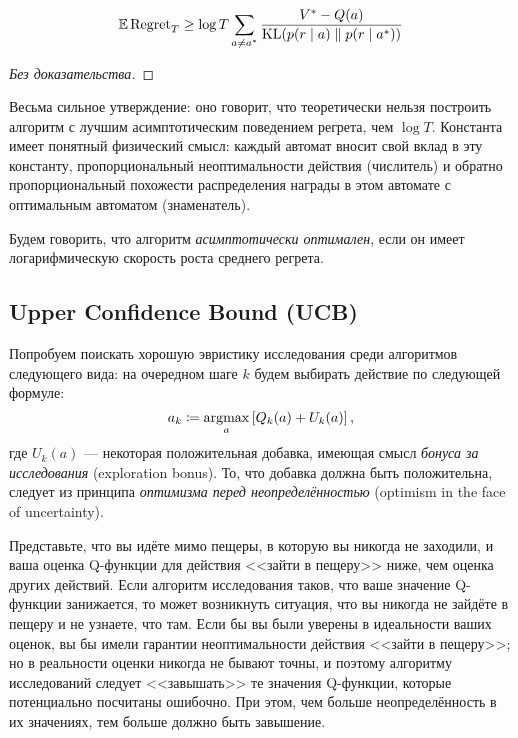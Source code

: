 \begin{theorem}
$$\mathbb{E} \operatorname{Regret}_T \ge \log T \sum_{a \ne a^*} \frac{V^* - Q(a)}{\operatorname{KL}(p(r \mid a) \parallel p(r \mid a^*))}$$
\begin{proof}[Без доказательства]
\end{proof}
\end{theorem}

Весьма сильное утверждение: оно говорит, что теоретически нельзя построить алгоритм с лучшим асимптотическим поведением регрета, чем $\log T$. Константа имеет понятный физический смысл: каждый автомат вносит свой вклад в эту константу, пропорциональный неоптимальности действия (числитель) и обратно пропорциональный похожести распределения награды в этом автомате с оптимальным автоматом (знаменатель). 

\begin{definition}
Будем говорить, что алгоритм \emph{асимптотически оптимален}, если он имеет логарифмическую скорость роста среднего регрета.
\end{definition}

\subsection{Upper Confidence Bound (UCB)}\label{subsec:ucb}

Попробуем поискать хорошую эвристику исследования среди алгоритмов следующего вида: на очередном шаге $k$ будем выбирать действие по следующей формуле:
\begin{equation}\label{ucb_exploration}
a_k \coloneqq \mathop{\mathrm{argmax}}_a \left[ Q_k(a) + U_k(a) \right],
\end{equation}
где $U_k(a)$ --- некоторая положительная добавка, имеющая смысл \emph{бонуса за исследования} (exploration bonus). То, что добавка должна быть положительна, следует из принципа \emph{оптимизма перед неопределённостью} (optimism in the face of uncertainty).

\begin{example}
Представьте, что вы идёте мимо пещеры, в которую вы никогда не заходили, и ваша оценка Q-функции для действия <<зайти в пещеру>> ниже, чем оценка других действий. Если алгоритм исследования таков, что ваше значение Q-функции занижается, то может возникнуть ситуация, что вы никогда не зайдёте в пещеру и не узнаете, что там. Если бы вы были уверены в идеальности ваших оценок, вы бы имели гарантии неоптимальности действия <<зайти в пещеру>>; но в реальности оценки никогда не бывают точны, и поэтому алгоритму исследований следует <<завышать>> те значения Q-функции, которые потенциально посчитаны ошибочно. При этом, чем больше неопределённость в их значениях, тем больше должно быть завышение.
\end{example}

